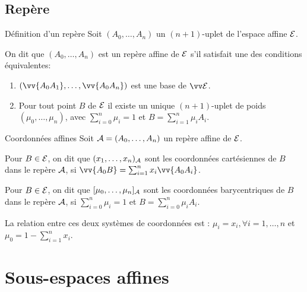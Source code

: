 \documentclass[bigger]{m53beamer}
\begin{document}
\subsection{Repère}
  \begin{frame}{Définition d'un repère}
    Soit $(A_{0},\ldots,A_{n})$ un $(n+1)$-uplet de l'espace affine $\mathcal{E}$.\pause\\
    \begin{defprop}
      On dit que $(A_{0},\ldots,A_{n})$ est \alert{un repère affine} de $\mathcal{E}$ s'il satisfait une des conditions équivalentes:
      \begin{enumerate}[<+(1)->]
        \item $(\vv{A_{0}A_{1}},\ldots,\vv{A_{0}A_{n}})$ est une base de $\ev{E}$.
        \item Pour tout point $B$ de $\mathcal{E}$ il existe un unique $(n+1)$-uplet de poids $(\mu_{0},\ldots,\mu_{n})$, avec $\sum_{i=0}^{n}\mu_{i}=1$ et $B=\sum_{i=1}^{n}\mu_{i}A_{i}$.
      \end{enumerate}
    \end{defprop}
  \end{frame}
  \begin{frame}{Coordonnées affines}
    Soit $\mathcal{A}=(A_{0},\ldots,A_{n})$ un repère affine de $\mathcal{E}$.\pause\\
    \begin{definition}
      Pour $B \in \mathcal{E}$, on dit que $(x_{1},\ldots,x_{n})_{\mathcal{A}}$ sont les \alert{coordonnées cartésiennes} de $B$ dans le repère $\mathcal{A}$, si $\vv{A_{0}B} = \sum_{i=1}^{n} x_{i}\vv{A_{0}A_{i}}$.
    \end{definition}\pause
    \begin{definition}
      Pour $B \in \mathcal{E}$, on dit que $[\mu_{0},\ldots,\mu_{n}]_{\mathcal{A}}$ sont les \alert{coordonnées barycentriques} de $B$ dans le repère $\mathcal{A}$, si $\sum_{i=0}^{n}\mu_{i}=1$ et $B=\sum_{i=0}^{n}\mu_{i}A_{i}$.
    \end{definition}\pause
    La relation entre ces deux systèmes de coordonnées est : $\mu_{i}=x_{i}, \forall i=1,\ldots,n$ et $\mu_{0}=1-\sum_{i=1}^{n}x_{i}$.
  \end{frame}

\section{Sous-espaces affines}
\end{document}
